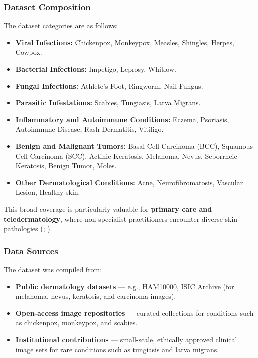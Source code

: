 \documentclass[
  12pt,
  oneside]{article}
\providecommand{\tightlist}{%
  \setlength{\itemsep}{0pt}\setlength{\parskip}{0pt}}
\begin{document}
\subsubsection{Dataset Composition}\label{dataset-composition}

The dataset categories are as follows:

\begin{itemize}
\tightlist
\item
  \textbf{Viral Infections:} Chickenpox, Monkeypox, Measles, Shingles,
  Herpes, Cowpox.
\item
  \textbf{Bacterial Infections:} Impetigo, Leprosy, Whitlow.
\item
  \textbf{Fungal Infections:} Athlete's Foot, Ringworm, Nail Fungus.
\item
  \textbf{Parasitic Infestations:} Scabies, Tungiasis, Larva Migrans.
\item
  \textbf{Inflammatory and Autoimmune Conditions:} Eczema, Psoriasis,
  Autoimmune Disease, Rash Dermatitis, Vitiligo.
\item
  \textbf{Benign and Malignant Tumors:} Basal Cell Carcinoma (BCC),
  Squamous Cell Carcinoma (SCC), Actinic Keratosis, Melanoma, Nevus,
  Seborrheic Keratosis, Benign Tumor, Moles.
\item
  \textbf{Other Dermatological Conditions:} Acne, Neurofibromatosis,
  Vascular Lesion, Healthy skin.
\end{itemize}

This broad coverage is particularly valuable for \textbf{primary care
and teledermatology}, where non-specialist practitioners encounter
diverse skin pathologies (; ).

\subsubsection{Data Sources}\label{data-sources}

The dataset was compiled from:

\begin{itemize}
\tightlist
\item
  \textbf{Public dermatology datasets} --- e.g., HAM10000, ISIC Archive
  (for melanoma, nevus, keratosis, and carcinoma images).
\item
  \textbf{Open-access image repositories} --- curated collections for
  conditions such as chickenpox, monkeypox, and scabies.
\item
  \textbf{Institutional contributions} --- small-scale, ethically
  approved clinical image sets for rare conditions such as tungiasis and
  larva migrans.
\end{itemize}
\end{document}

